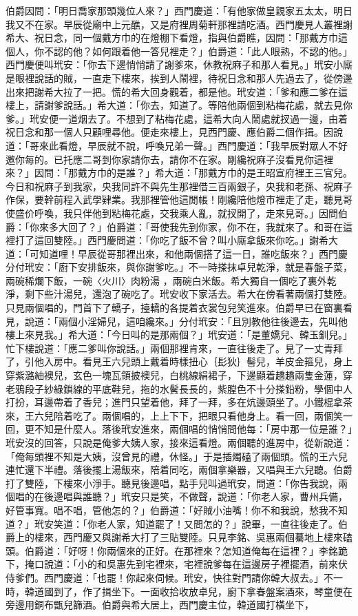 \begin{showcontents}{}
伯爵因問：「明日喬家那頭幾位人來？」西門慶道：「有他家做皇親家五太太，明日我又不在家。早辰從廟中上元醮，又是府裡周菊軒那裡請吃酒。西門慶見人叢裡謝希大、祝日念，同一個戴方巾的在燈棚下看燈，指與伯爵瞧，因問：「那戴方巾這個人，你不認的他？如何跟着他一答兒裡走？」伯爵道：「此人眼熟，不認的他。」西門慶便叫玳安：「你去下邊悄悄請了謝爹來，休教祝麻子和那人看見。」玳安小廝是眼裡說話的賊，一直走下樓來，挨到人鬧裡，待祝日念和那人先過去了，從傍邊出來把謝希大拉了一把。慌的希大回身觀着，都是他。玳安道：「爹和應二爹在這樓上，請謝爹說話。」希大道：「你去，知道了。等陪他兩個到粘梅花處，就去見你爹。」玳安便一道烟去了。不想到了粘梅花處，這希大向人鬧處就扠過一邊，由着祝日念和那一個人只顧哩尋他。便走來樓上，見西門慶、應伯爵二個作揖。因說道：「哥來此看燈，早辰就不說，呼喚兄弟一聲。」西門慶道：「我早辰對眾人不好邀你每的。已托應二哥到你家請你去，請你不在家。剛纔祝麻子沒看見你這裡來？」因問：「那戴方巾的是誰？」希大道：「那戴方巾的是王昭宣府裡王三官兒。今日和祝麻子到我家，央我同許不與先生那裡借三百兩銀子，央我和老孫、祝麻子作保，要幹前程入武學肄業。我那裡管他這閒帳！剛纔陪他燈市裡走了走，聽見哥使盛价呼喚，我只伴他到粘梅花處，交我乘人亂，就扠開了，走來見哥。」因問伯爵：「你來多大回了？」伯爵道：「哥使我先到你家，你不在，我就來了。和哥在這裡打了這回雙陸。」西門慶問道：「你吃了飯不曾？叫小廝拿飯來你吃。」謝希大道：「可知道哩！早辰從哥那裡出來，和他兩個搭了這一日，誰吃飯來？」西門慶分付玳安：「廚下安排飯來，與你謝爹吃。」不一時搽抹卓兒乾淨，就是春盤子菜，兩碗稀爛下飯，一碗〈火川〉肉粉湯 ，兩碗白米飯。希大獨自一個吃了裏外乾淨，剩下些汁湯兒，還泡了碗吃了。玳安收下家活去。希大在傍看著兩個打雙陸。只見兩個唱的，門首下了轎子，擡轎的各提着衣裳包兒笑進來。伯爵早已在窗裏看見，說道：「兩個小淫婦兒，這咱纔來。」分付玳安：「且別教他往後邊去，先叫他樓上來見我。」希大道：「今日叫的是那兩個？」玳安道：「是董嬌兒、韓玉釧兒。」忙下樓說道：「應二爹叫你說話。」兩個那裡肯來，一直往後走了。見了一丈青拜了，引他入房中。看見王六兒頭上戴着時樣扭心｛髟狄｝髻兒，羊皮金箍兒，身上穿紫潞紬襖兒，玄色一塊瓦領披襖兒，白桃線絹裙子，下邊顯着趫趫兩隻金蓮，穿老鴉段子紗綠鎖線的平底鞋兒，拖的水鬢長長的，紫膛色不十分搽鉛粉，學個中人打扮，耳邊帶着了香兒；進門只望着他，拜了一拜，多在炕邊頭坐了。小鐵棍拿茶來，王六兒陪着吃了。兩個唱的，上上下下，把眼只看他身上。看一回，兩個笑一回，更不知是什麼人。落後玳安進來，兩個唱的悄悄問他每：「房中那一位是誰？」玳安沒的回答，只說是俺爹大姨人家，接來這看燈。兩個聽的進房中，從新說道：「俺每頭裡不知是大姨，沒曾見的禮，休怪。」于是插燭磕了兩個頭。慌的王六兒連忙還下半禮。落後擺上湯飯來，陪着同吃，兩個拿樂器，又唱與王六兒聽。伯爵打了雙陸，下樓來小淨手。聽見後邊唱，點手兒叫過玳安，問道：「你告我說，兩個唱的在後邊唱與誰聽？」玳安只是笑，不做聲，說道：「你老人家，曹州兵備，好管事寬。唱不唱，管他怎的？」伯爵道：「好賊小油嘴！你不和我說，愁我不知道？」玳安笑道：「你老人家，知道罷了！又問怎的？」說畢，一直往後走了。伯爵上的樓來，西門慶又與謝希大打了三貼雙陸。只見李銘、吳惠兩個驀地上樓來磕頭。伯爵道：「好呀！你兩個來的正好。在那裡來？怎知道俺每在這裡？」李銘跪下，掩口說道：「小的和吳惠先到宅裡來，宅裡說爹每在這邊房子裡擺酒，前來伏侍爹們。西門慶道：「也罷！你起來伺候。玳安，快往對門請你韓大叔去。」不一時，韓道國到了，作了揖坐下。一面收拾收放卓兒，廚下拿春盤案酒來，琴童便在旁邊用銅布甑兒篩酒。伯爵與希大居上，西門慶主位，韓道國打橫坐下，
\end{showcontents}
